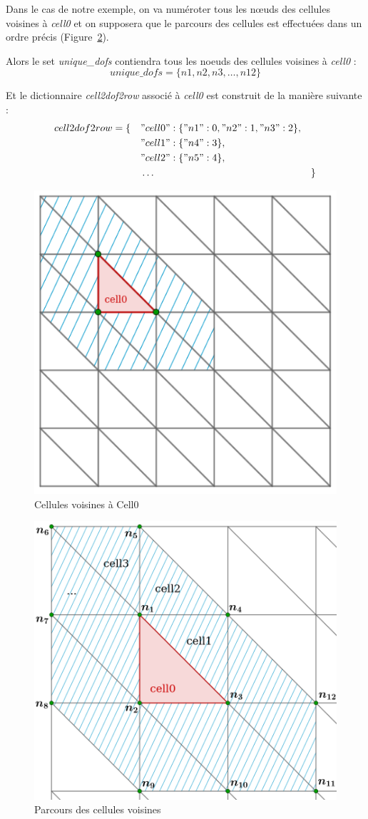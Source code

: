 \documentclass[french]{article}
\begin{document}
	Dans le cas de notre exemple, on va numéroter tous les nœuds des cellules voisines à \textit{cell0} et on supposera que le parcours des cellules est effectuées dans un ordre précis (Figure~\ref{fig4}).
	
	Alors le set \textit{unique\_dofs} contiendra tous les noeuds des cellules voisines à \textit{cell0} : 
	$$unique\_dofs = \{n1,n2,n3,\dots,n12\}$$
	
	Et le dictionnaire \textit{cell2dof2row} associé à \textit{cell0} est construit de la manière suivante :
	$$cell2dof2row = \begin{aligned}[t]
		\{\quad&"cell0":\{"n1":0,"n2":1,"n3":2\},&& \\
		&"cell1":\{"n4":3\}, \\
		&"cell2":\{"n5":4\}, \\
		&\dots &&\}
	\end{aligned}$$

	\begin{minipage}{0.48\linewidth}
		\begin{figure}[H]
			\centering
			\includegraphics[width=0.6\linewidth]{surrounding_cells.png}
			\caption{Cellules voisines à Cell0}
			\label{fig3}
		\end{figure}
	\end{minipage}
	\begin{minipage}{0.48\linewidth}
		\begin{figure}[H]
			\centering
			\includegraphics[width=0.6\linewidth]{cell2dof2row.png}
			\caption{Parcours des cellules voisines}
			\label{fig4}
		\end{figure}
	\end{minipage}
	
\end{document}
